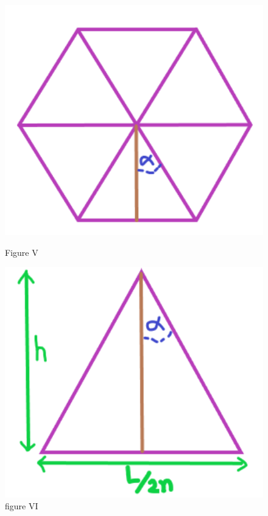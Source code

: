 \documentclass[a4paper]{book}
\begin{document}
\begin{figure} [h]
    \centering
    \begin{minipage}{0.5\textwidth}
        \centering
        \includegraphics[width=1\textwidth]{isofig8.png} %
        \caption{Figure V}
    \end{minipage}\hfill
    \begin{minipage}{0.5\textwidth}
        \centering
        \includegraphics[width=1\textwidth]{isofig9.png} %
        \caption{figure VI}
    \end{minipage}
\end{figure}
\end{document}
